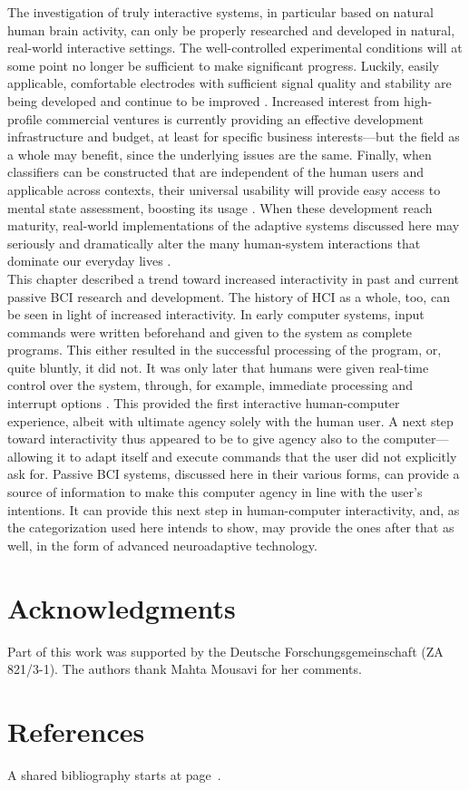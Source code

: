 The investigation of truly interactive systems, in particular based on natural human brain activity, can only be properly researched and developed in natural, real-world interactive settings. The well-controlled experimental conditions will at some point no longer be sufficient to make significant progress. Luckily, easily applicable, comfortable electrodes with sufficient signal quality and stability are being developed and continue to be improved \cite{zander2011dry,mullen2015dry,goverdovsky2016eareeg,zander2017dry}. Increased interest from high-profile commercial ventures is currently providing an effective development infrastructure and budget, at least for specific business interests---but the field as a whole may benefit, since the underlying issues are the same. Finally, when classifiers can be constructed that are independent of the human users and applicable across contexts, their universal usability will provide easy access to mental state assessment, boosting its usage \cite{zander2012diss,wei2015transferlearning,krol2016workload}. When these development reach maturity, real-world implementations of the adaptive systems discussed here may seriously and dramatically alter the many human-system interactions that dominate our everyday lives \cite{mcdowell2013realworld}. \\

This chapter described a trend toward increased interactivity in past and current passive BCI research and development. The history of HCI as a whole, too, can be seen in light of increased interactivity. In early computer systems, input commands were written beforehand and given to the system as complete programs. This either resulted in the successful processing of the program, or, quite bluntly, it did not. It was only later that humans were given real-time control over the system, through, for example, immediate processing and interrupt options \cite{suchman1987hmcproblems}. This provided the first interactive human-computer experience, albeit with ultimate agency solely with the human user. A next step toward interactivity thus appeared to be to give agency also to the computer---allowing it to adapt itself and execute commands that the user did not explicitly ask for. Passive BCI systems, discussed here in their various forms, can provide a source of information to make this computer agency in line with the user's intentions. It can provide this next step in human-computer interactivity, and, as the categorization used here intends to show, may provide the ones after that as well, in the form of advanced neuroadaptive technology.


\section*{Acknowledgments}

Part of this work was supported by the Deutsche Forschungsgemeinschaft (ZA 821/3-1). The authors thank Mahta Mousavi for her comments.


\section*{References}

A shared bibliography starts at page~\pageref{bibliography}.


\clearpage
\pagestyle{plain}
